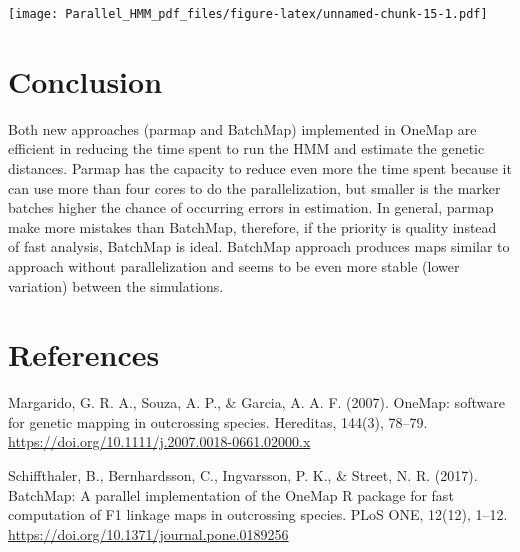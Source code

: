 \documentclass[]{article}
\begin{document}
\texttt{[image: Parallel\_HMM\_pdf\_files/figure-latex/unnamed-chunk-15-1.pdf]}

\hypertarget{conclusion}{%
\section{Conclusion}\label{conclusion}}

Both new approaches (parmap and BatchMap) implemented in OneMap are
efficient in reducing the time spent to run the HMM and estimate the
genetic distances. Parmap has the capacity to reduce even more the time
spent because it can use more than four cores to do the parallelization,
but smaller is the marker batches higher the chance of occurring errors
in estimation. In general, parmap make more mistakes than BatchMap,
therefore, if the priority is quality instead of fast analysis, BatchMap
is ideal. BatchMap approach produces maps similar to approach without
parallelization and seems to be even more stable (lower variation)
between the simulations.

\hypertarget{references}{%
\section{References}\label{references}}

Margarido, G. R. A., Souza, A. P., \& Garcia, A. A. F. (2007). OneMap:
software for genetic mapping in outcrossing species. Hereditas, 144(3),
78--79. \url{https://doi.org/10.1111/j.2007.0018-0661.02000.x}

Schiffthaler, B., Bernhardsson, C., Ingvarsson, P. K., \& Street, N. R.
(2017). BatchMap: A parallel implementation of the OneMap R package for
fast computation of F1 linkage maps in outcrossing species. PLoS ONE,
12(12), 1--12. \url{https://doi.org/10.1371/journal.pone.0189256}
\end{document}

